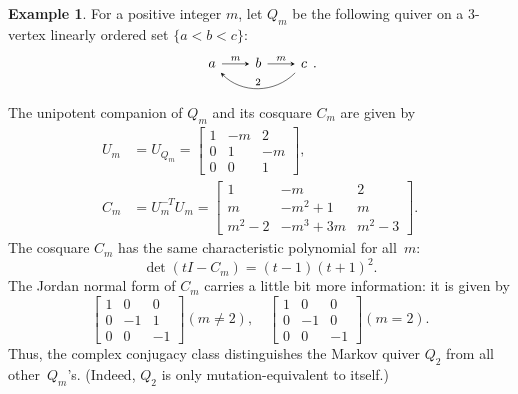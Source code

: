 \documentclass[11pt, letterpaper]{amsart}
\theoremstyle{definition}
\newtheorem{example}[theorem]{Example}
\numberwithin{equation}{section}
\begin{document}
\begin{example}
\label{eg:2mm}
For a positive integer $m$, let $Q_m$ be the following quiver on a 3-vertex linearly ordered set $\{a<b<c\}$:
\begin{equation}
\label{eq:Qm-2mm}
 \begin{tikzcd}[arrows={-stealth}, sep=2em]
  a  \arrow[r,  "m"]   & b  \arrow[r, "m"] & c \arrow[ll, bend left=45, swap, "2"] 
\end{tikzcd}.
\end{equation}
%
The unipotent companion of $Q_m$ and its cosquare $C_m$ are given by
\begin{align*}
U_m &=U_{Q_m}= \begin{bmatrix} 1 & -m & 2 \\ 0 & 1 & -m \\ 0 &  0 & 1 \end{bmatrix}, 
\\
C_m&=U_m^{-T}U_m= \begin{bmatrix} 1 & -m & 2 \\ m & -m^2+1 & m \\ m^2-2 & -m^3+3m & m^2-3\end{bmatrix}.
\end{align*}
The cosquare $C_m$ has the same characteristic polynomial for all~$m$: 
\begin{equation*}
\det(tI-C_m) = (t - 1)(t + 1)^2. 
\end{equation*}
The Jordan normal form of $C_m$ carries a little bit more information: it is given by
\begin{equation*}
\begin{bmatrix}
1 & 0 & 0 \\
0 & -1 & 1 \\
0 & 0 & -1
\end{bmatrix}
(m\neq 2), 
\quad
\begin{bmatrix}
1 & 0 & 0 \\
0 & -1 & 0 \\
0 & 0 & -1
\end{bmatrix}
(m= 2). 
\end{equation*}
Thus, the complex conjugacy class distinguishes the Markov quiver $Q_2$ from all other~$Q_m$'s.
(Indeed, $Q_2$ is only mutation-equivalent to itself.)


\end{example}
\end{document}
